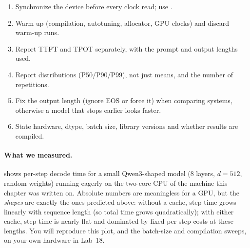 \begin{keyidea}
\begin{enumerate}
  \item Synchronize the device before every clock read; use .
  \item Warm up (compilation, autotuning, allocator, GPU clocks) and discard warm-up runs.
  \item Report TTFT and TPOT separately, with the prompt and output lengths used.
  \item Report distributions (P50/P90/P99), not just means, and the number of repetitions.
  \item Fix the output length (ignore EOS or force it) when comparing systems, otherwise a model
    that stops earlier looks faster.
  \item State hardware, dtype, batch size, library versions and whether results are compiled.
\end{enumerate}
\end{keyidea}

\paragraph{What we measured.}  shows per-step decode time for a small
Qwen3-shaped model (8 layers, $d=512$, random weights) running eagerly on the two-core CPU of the
machine this chapter was written on. Absolute numbers are meaningless for a GPU, but the
\emph{shapes} are exactly the ones predicted above: without a cache, step time grows linearly with
sequence length (so total time grows quadratically); with either cache, step time is nearly flat
and dominated by fixed per-step costs at these lengths. You will reproduce this plot, and the
batch-size and compilation sweeps, on your own hardware in Lab~18.

